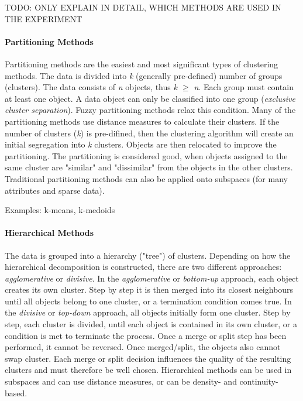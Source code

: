 TODO: ONLY EXPLAIN IN DETAIL, WHICH METHODS ARE USED IN THE EXPERIMENT
  \paragraph{Partitioning Methods}
  Partitioning methods are the easiest and most significant types of clustering methods. The data is divided into \textit{k} (generally pre-defined) number of groups (clusters). The data consists of \textit{n} objects, thus \textit{k $\geq$ n}. Each group must contain at least one object. A data object can only be classified into one group (\textit{exclusive cluster separation}). Fuzzy partitioning methods relax this condition.
  Many of the partitioning methods use distance measures to calculate their clusters. If the number of clusters (\textit{k}) is pre-difined, then the clustering algorithm will create an initial segregation into \textit{k} clusters. Objects are then relocated to improve the partitioning. The partitioning is considered good, when objects assigned to the same cluster are "similar" and "dissimilar" from the objects in the other clusters. Traditional partitioning methods can also be applied onto subspaces (for many attributes and sparse data). 
  
  Examples: k-means, k-medoids



  \paragraph{Hierarchical Methods}
  The data is grouped into a hierarchy ("tree") of clusters. Depending on how the hierarchical decomposition is constructed, there are two different approaches: \textit{agglomerative} or \textit{divisive}. In the \textit{agglomerative} or \textit{bottom-up} approach, each object creates its own cluster. Step by step it is then merged into its closest neighbours until all objects belong to one cluster, or a termination condition comes true. In the \textit{divisive} or \textit{top-down} approach, all objects initially form one cluster. Step by step, each cluster is divided, until each object is contained in its own cluster, or a condition is met to terminate the process. Once a merge or split step has been performed, it cannot be reversed. Once merged/split, the objects also cannot swap cluster. Each merge or split decision influences the quality of the resulting clusters and must therefore be well chosen. Hierarchical methods can be used in subspaces and can use distance measures, or can be density- and continuity-based.


